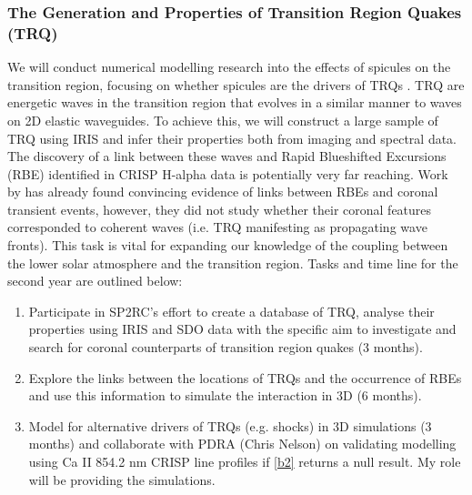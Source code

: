 \documentclass[12pt,a4paper,twoside]{article}
\begin{document}
\subsubsection{The Generation and Properties of Transition Region Quakes (TRQ)} \label{sec1}
We will conduct numerical modelling research into the effects of spicules on the transition region, focusing on whether spicules are the drivers of TRQs \citep{Scullion2011}. TRQ are energetic waves in the transition region that evolves in a similar manner to waves on 2D elastic waveguides. To achieve this, we will construct a large sample of TRQ using IRIS and infer their properties both from imaging and spectral data. The discovery of a link between these waves and Rapid Blueshifted Excursions (RBE) identified in CRISP H-alpha data is potentially very far reaching. Work by \cite{Henriques2016} has already found convincing evidence of links between RBEs and coronal transient events, however, they did not study whether their coronal features corresponded to coherent waves (i.e. TRQ manifesting as propagating wave fronts). This task is vital for expanding our knowledge of the coupling between the lower solar atmosphere and the transition region. Tasks and time line for the second year are outlined below:
\begin{enumerate}
\item Participate in SP2RC’s effort to create a database of TRQ, analyse their properties using IRIS and SDO data with the specific aim to investigate and search for coronal counterparts of transition region quakes (3 months). \label{b1}
\item Explore the links between the locations of TRQs and the occurrence of RBEs and use this information to simulate the interaction in 3D (6 months). \label{b2}
\item Model for alternative drivers of TRQs (e.g. shocks) in 3D simulations (3 months) and collaborate with PDRA (Chris Nelson) on validating modelling using Ca II 854.2 nm CRISP line profiles if \eqref{b2} returns a null result. My role will be providing the simulations. \label{b3}
\end{enumerate}
\end{document}
